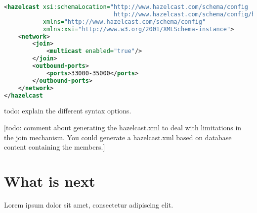 \begin{lstlisting}[language=xml]
<hazelcast xsi:schemaLocation="http://www.hazelcast.com/schema/config
                               http://www.hazelcast.com/schema/config/hazelcast-config-2.5.xsd"
           xmlns="http://www.hazelcast.com/schema/config"
           xmlns:xsi="http://www.w3.org/2001/XMLSchema-instance">
    <network>
        <join>
            <multicast enabled="true"/>
        </join>
        <outbound-ports>
            <ports>33000-35000</ports>
        </outbound-ports>
    </network>
</hazelcast
\end{lstlisting}

todo: explain the different syntax options.

[todo: comment about generating the hazelcast.xml to deal with limitations in the join mechanism. You could generate
a hazelcast.xml based on database content containing the members.]

\section{What is next}
Lorem ipsum dolor sit amet, consectetur adipiscing elit. 
